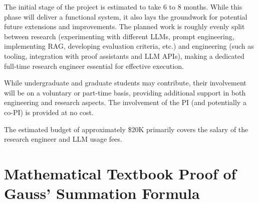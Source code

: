 \documentclass[10pt,nonacm,natbib=false]{acmart}
\begin{document}
The initial stage of the project is estimated to take 6 to 8
months. While this phase will deliver a functional system, it also
lays the groundwork for potential future extensions and
improvements. The planned work is roughly evenly split between
research (experimenting with different LLMs, prompt engineering,
implementing RAG, developing evaluation criteria, etc.) and
engineering (such as tooling, integration with proof assistants and
LLM APIs), making a dedicated full-time research engineer essential
for effective execution.

While undergraduate and graduate students may contribute, their
involvement will be on a voluntary or part-time basis, providing
additional support in both engineering and research aspects. The
involvement of the PI (and potentially a co-PI) is provided at no
cost.

The estimated budget of approximately \$20K primarily covers the
salary of the research engineer and LLM usage fees.

\appendix

\newpage
\section{Mathematical Textbook Proof of Gauss' Summation Formula}

\label{sec:textbookproof}
\end{document}
